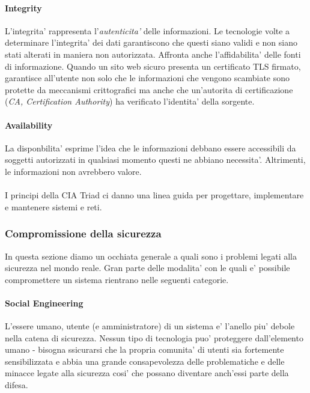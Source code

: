 \paragraph{Integrity}
L'integrita' rappresenta l'\emph{autenticita'} delle informazioni. Le tecnologie volte a determinare l'integrita' dei dati garantiscono che questi siano validi e non siano stati alterati in maniera non autorizzata. Affronta anche l'affidabilita' delle fonti di informazione. Quando un sito web sicuro presenta un certificato TLS firmato, garantisce all'utente non solo che le informazioni che vengono scambiate sono protette da meccanismi crittografici ma anche che un'autorita di certificazione (\emph{CA, Certification Authority}) ha verificato l'identita' della sorgente.

\paragraph{Availability}
La disponbilita' esprime l'idea che le informazioni debbano essere accessibili da soggetti autorizzati in qualsiasi momento questi ne abbiano necessita'. Altrimenti, le informazioni non avrebbero valore.
\\\\
I principi della CIA Triad ci danno una linea guida per progettare, implementare e mantenere sistemi e reti.

\subsubsection{Compromissione della sicurezza}
In questa sezione diamo un occhiata generale a quali sono i problemi legati alla sicurezza nel mondo reale. Gran parte delle modalita' con le quali e' possibile compromettere un sistema rientrano nelle seguenti categorie.

\paragraph{Social Engineering}
L'essere umano, utente (e amministratore) di un sistema e' l'anello piu' debole nella catena di sicurezza. Nessun tipo di tecnologia puo' proteggere dall'elemento umano - bisogna ssicurarsi che la propria comunita' di utenti sia fortemente sensibilizzata e abbia una grande consapevolezza delle problematiche e delle minacce legate alla sicurezza cosi' che possano diventare anch'essi parte della difesa.


